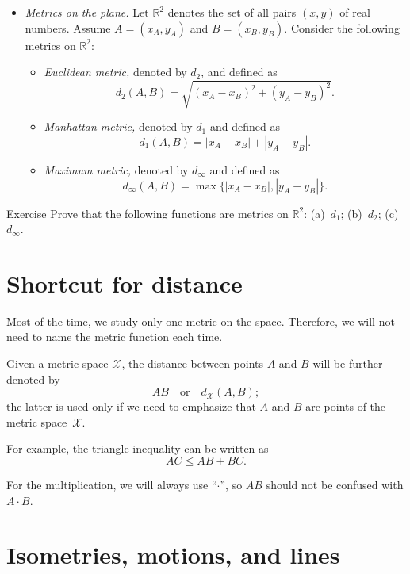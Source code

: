 \begin{itemize}
\item {}\emph{Metrics on the plane.}
Let $\mathbb{R}^2$ denotes the set of all pairs $(x,y)$ of real numbers.
Assume $A=(x_A,y_A)$ and $B=(x_B,y_B)$.
Consider the following metrics on $\mathbb{R}^2$:
\begin{itemize}
\item{}\emph{Euclidean metric,} denoted by $d_2$, and defined as \label{def:d_2}
$$d_2(A,B)=\sqrt{(x_A-x_B)^2+(y_A-y_B)^2}.$$
\item\label{Manhattan plane}\emph{Manhattan metric,} denoted by $d_1$ and defined as 
$$d_1(A,B)=|x_A-x_B|+|y_A-y_B|.$$
\item{}\emph{Maximum metric,} denoted by $d_\infty$ and defined as 
$$d_\infty(A,B)=\max\{|x_A-x_B|,|y_A-y_B|\}.$$
\end{itemize}
\end{itemize}

\begin{thm}{Exercise}\label{ex:d_1+d_2+d_infty}
Prove that the following functions are metrics on $\mathbb{R}^2$:
(a)~$d_1$; (b)~$d_2$; (c)~$d_\infty$.
\end{thm}


\section*{Shortcut for distance}

Most of the time, 
we study only one metric on the space.
Therefore, we will not need to name the metric function each time.

Given a metric space $\mathcal X$,
the distance between points $A$ and $B$ will be further denoted by 
$$AB
\quad
\text{or}
\quad
d_{\mathcal X}(A,B);$$
the latter is used only if we need to emphasize that $A$ and $B$ are points of the metric space~$\mathcal X$.

For example, the triangle inequality can be written as 
$$AC\le AB+BC.$$

For the multiplication, we will always use ``$\cdot$'',
so $AB$ should not be confused with $A\cdot B$.

\section*{Isometries, motions, and lines}

